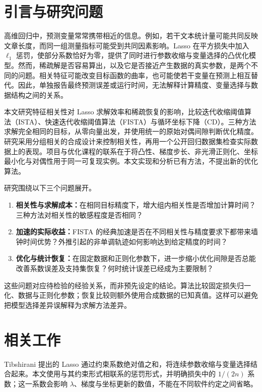 \section{引言与研究问题}
高维回归中，预测变量常常携带相近的信息。例如，若干文本统计量可能共同反映文章长度，而同一组测量指标可能受到共同因素影响。Lasso 在平方损失中加入 $\ell_1$ 惩罚，使部分系数恰好为零，提供了同时进行参数收缩与变量选择的凸优化模型\cite{tibshirani1996}。然而，稀疏解是否容易算出，以及它是否接近产生数据的真实参数，是两个不同的问题。相关特征可能改变目标函数的曲率，也可能使若干变量在预测上相互替代。因此，单独报告最终预测误差或运行时间，无法解释计算精度、变量选择与数据结构之间的关系。

本文研究特征相关性对 Lasso 求解效率和稀疏恢复的影响，比较迭代收缩阈值算法（ISTA）、快速迭代收缩阈值算法（FISTA）与循环坐标下降（CD）。三种方法求解完全相同的目标，从零向量出发，并使用统一的原始对偶间隙判断优化精度。研究采用分组相关的合成设计来控制相关性，再用一个公开回归数据集检查实际数据上的表现。项目与优化课程的联系在于将凸性、梯度步长、非光滑正则化、坐标最小化与对偶性用于同一可复现实例。本文实现和分析已有方法，不提出新的优化算法。

研究围绕以下三个问题展开。
\begin{enumerate}
  \item \textbf{相关性与求解成本：}在相同目标精度下，增大组内相关性是否增加计算时间？三种方法对相关性的敏感程度是否相同？
  \item \textbf{加速的实际收益：}FISTA 的经典加速是否在不同相关性与精度要求下都带来墙钟时间优势？外推引起的非单调轨迹如何影响达到给定精度的时间？
  \item \textbf{优化与统计恢复：}在固定数据和正则化参数下，进一步缩小优化间隙是否总能改善系数误差及支持集恢复？何时统计误差已经成为主要限制？
\end{enumerate}
这些问题对应待检验的经验关系，而非预先设定的结论。算法比较固定损失归一化、数据与正则化参数；恢复比较则额外使用合成数据的已知真值。这样可以避免把模型选择差异误解释为求解方法差异。

\section{相关工作}
Tibshirani 提出的 Lasso 通过约束系数绝对值之和，将连续参数收缩与变量选择结合起来\cite{tibshirani1996}。本文使用与其约束形式相联系的惩罚形式，并明确损失中的 $1/(2n)$ 系数；这一系数会影响 $\lambda$、梯度与坐标更新的数值，不能在不同软件约定之间省略。

